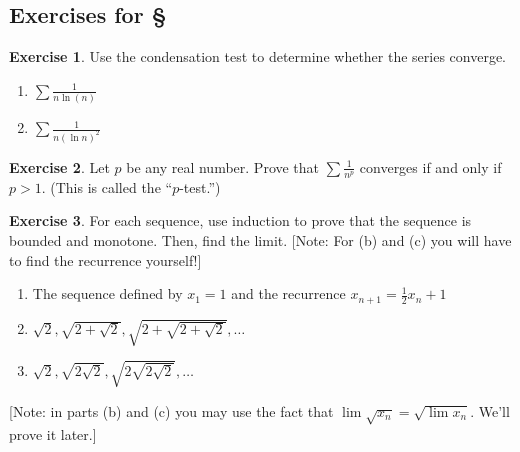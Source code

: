\documentclass[11pt,oneside]{amsbook}
\theoremstyle{definition}
\newtheorem{exerc}{Exercise}[section]
\theoremstyle{plain}
\newtheorem{corollary}[theorem]{Corollary}
\theoremstyle{definition}
\theoremstyle{remark}
\newtheorem{example}[theorem]{Example}
\numberwithin{equation}{section}
\numberwithin{figure}{section}
\begin{document}


\newpage
\subsection*{Exercises for \S \thesection}

\begin{exerc}
  Use the condensation test to determine whether the series converge.
  \begin{enumerate}
    \item $\sum\frac{1}{n\ln(n)}$
    \item $\sum\frac{1}{n(\ln n)^2}$
  \end{enumerate}
\end{exerc}
 
\begin{exerc}
  Let $p$ be any real number. Prove that $\sum\frac1{n^p}$ converges if and only if $p>1$. (This is called the ``$p$-test.'')
\end{exerc}

\begin{exerc}
  For each sequence, use induction to prove that the sequence is bounded and monotone. Then, find the limit.  [Note: For (b) and (c) you will have to find the recurrence yourself!]
  \begin{enumerate}
    \item The sequence defined by $x_1=1$ and the recurrence $x_{n+1}=\frac12x_n+1$
    \item $\sqrt{2},\sqrt{2+\sqrt{2}},\sqrt{2+\sqrt{2+\sqrt{2}}},\ldots$
    \item $\sqrt{2},\sqrt{2\sqrt{2}},\sqrt{2\sqrt{2\sqrt{2}}},\ldots$
  \end{enumerate}
  [Note: in parts (b) and (c) you may use the fact that $\lim\sqrt{x_n}=\sqrt{\lim x_n}$. We'll prove it later.]
\end{exerc}
\end{document}
